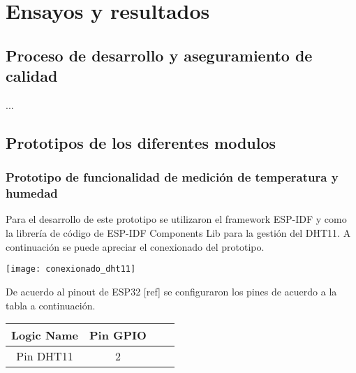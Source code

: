 
\chapter{Ensayos y resultados} %

\label{Chapter4} %


\section{Proceso de desarrollo y aseguramiento de calidad}
\label{sec:pruebasHW}

...

\section{Prototipos de los diferentes modulos}
\label{sec:pruebasHW}


\subsection{Prototipo de funcionalidad de medición de temperatura y humedad}

Para el desarrollo de este prototipo se utilizaron el framework ESP-IDF y como la librería de código de ESP-IDF Components Lib para la gestión del DHT11. A continuación se puede apreciar el conexionado del prototipo.

\begin{center}
\texttt{[image: conexionado\_dht11]}
\end{center}

De acuerdo al pinout de ESP32 [ref] se configuraron los pines de acuerdo a la tabla a continuación. 

\begin{center}

\begin{tabular}{|c |c |c |c|} 
 \hline
 Logic Name & Pin GPIO  \\ [0.5ex] 
 \hline
 Pin DHT11  & 2  \\ [1ex] 
 \hline
\end{tabular}


\end{center}
